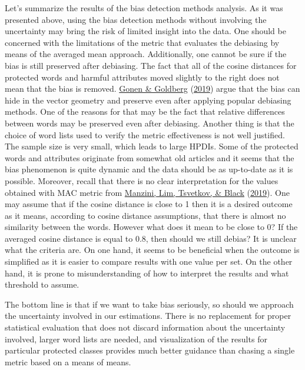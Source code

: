 \documentclass[
  12pt,
]{book}
\begin{document}
Let's summarize the results of the bias detection methods analysis. As it was presented above, using the bias detection methods without involving the uncertainty may bring the risk of limited insight into the data. One should be concerned with the limitations of the metric that evaluates the debiasing by means of the averaged mean approach. Additionally, one cannot be sure if the bias is still preserved after debiasing. The fact that all of the cosine distances for protected words and harmful attributes moved slightly to the right does not mean that the bias is removed. \protect\hyperlink{ref-Gonen2019Lipstick}{Gonen \& Goldberg} (\protect\hyperlink{ref-Gonen2019Lipstick}{2019}) argue that the bias can hide in the vector geometry and preserve even after applying popular debiasing methods. One of the reasons for that may be the fact that relative differences between words may be preserved even after debiasing. Another thing is that the choice of word lists used to verify the metric effectiveness is not well justified. The sample size is very small, which leads to large HPDIs. Some of the protected words and attributes originate from somewhat old articles and it seems that the bias phenomenon is quite dynamic and the data should be as up-to-date as it is possible. Moreover, recall that there is no clear interpretation for the values obtained with MAC metric from \protect\hyperlink{ref-Manzini2019blackToCriminal}{Manzini, Lim, Tsvetkov, \& Black} (\protect\hyperlink{ref-Manzini2019blackToCriminal}{2019}). One may assume that if the cosine distance is close to 1 then it is a desired outcome as it means, according to cosine distance assumptions, that there is almost no similarity between the words. However what does it mean to be close to 0? If the averaged cosine distance is equal to 0.8, then should we still debias? It is unclear what the criteria are. On one hand, it seems to be beneficial when the outcome is simplified as it is easier to compare results with one value per set. On the other hand, it is prone to misunderstanding of how to interpret the results and what threshold to assume.

The bottom line is that if we want to take bias seriously, so should we approach the uncertainty involved in our estimations. There is no replacement for proper statistical evaluation that does not discard information about the uncertainty involved, larger word lists are needed, and visualization of the results for particular protected classes provides much better guidance than chasing a single metric based on a means of means.
\end{document}
